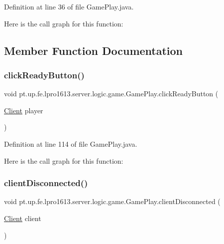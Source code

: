 Definition at line 36 of file Game\+Play.\+java.

Here is the call graph for this function\+:


\subsection{Member Function Documentation}
\hypertarget{classpt_1_1up_1_1fe_1_1lpro1613_1_1server_1_1logic_1_1game_1_1_game_play_ac67b135e1384dfb3baa62ec4837f07fb}{}\label{classpt_1_1up_1_1fe_1_1lpro1613_1_1server_1_1logic_1_1game_1_1_game_play_ac67b135e1384dfb3baa62ec4837f07fb} 
\subsubsection{\texorpdfstring{click\+Ready\+Button()}{clickReadyButton()}}
{\footnotesize\ttfamily void pt.\+up.\+fe.\+lpro1613.\+server.\+logic.\+game.\+Game\+Play.\+click\+Ready\+Button (\begin{DoxyParamCaption}\item[{\hyperlink{classpt_1_1up_1_1fe_1_1lpro1613_1_1server_1_1conn_1_1_client}{Client}}]{player }\end{DoxyParamCaption})}



Definition at line 114 of file Game\+Play.\+java.

Here is the call graph for this function\+:
\hypertarget{classpt_1_1up_1_1fe_1_1lpro1613_1_1server_1_1logic_1_1game_1_1_game_play_a23edaada7de872711e0cfe61163dec57}{}\label{classpt_1_1up_1_1fe_1_1lpro1613_1_1server_1_1logic_1_1game_1_1_game_play_a23edaada7de872711e0cfe61163dec57} 
\subsubsection{\texorpdfstring{client\+Disconnected()}{clientDisconnected()}}
{\footnotesize\ttfamily void pt.\+up.\+fe.\+lpro1613.\+server.\+logic.\+game.\+Game\+Play.\+client\+Disconnected (\begin{DoxyParamCaption}\item[{\hyperlink{classpt_1_1up_1_1fe_1_1lpro1613_1_1server_1_1conn_1_1_client}{Client}}]{client }\end{DoxyParamCaption})}



